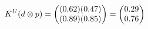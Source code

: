 \documentclass[preview]{standalone}
\begin{document}
\begin{align*}
\special{dvisvgm:raw <g id='unique000'>}K^U(d \otimes p) = \begin{pmatrix} (0.62)(0.47) \\ (0.89)(0.85) \end{pmatrix} = \begin{pmatrix} 0.29 \\ 0.76 \end{pmatrix}\special{dvisvgm:raw </g>}
\end{align*}
\end{document}
